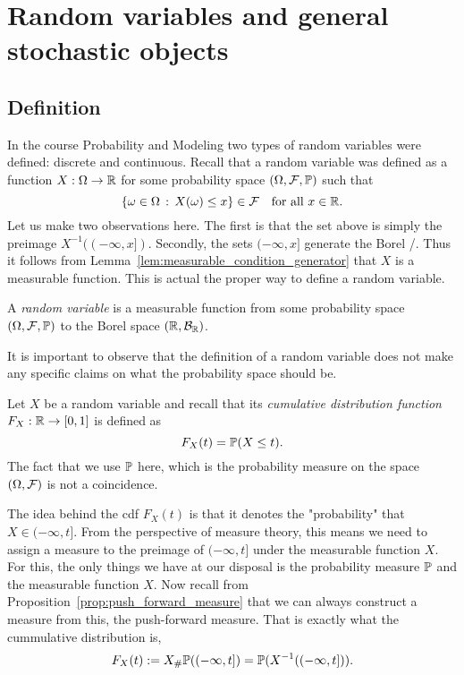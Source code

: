 
\section{Random variables and general stochastic objects}\label{sec:random_variables}


\subsection{Definition}

In the course Probability and Modeling two types of random variables were defined: discrete and continuous. Recall that a random variable was defined as a function $X : \Omega \to \mathbb R$ for some probability space $(\Omega, \mathcal F, \mathbb P)$ such that
\[
	\{\omega \in \Omega \, : \, X(\omega) \le x\} \in \mathcal F \quad \text{for all } x \in \mathbb R.
\]
Let us make two observations here. The first is that the set above is simply the preimage $X^{-1}((-\infty,x])$. Secondly, the sets $(-\infty, x]$ generate the Borel \sigalg/. Thus it follows from Lemma~\ref{lem:measurable_condition_generator} that $X$ is a measurable function. This is actual the proper way to define a random variable.

\begin{definition}
A \emph{random variable} is a measurable function from some probability space $(\Omega,\mathcal F, \mathbb P)$ to the Borel space $(\mathbb R, \mathcal B_{\mathbb R})$.
\end{definition}

It is important to observe that the definition of a random variable does not make any specific claims on what the probability space should be. 

Let $X$ be a random variable and recall that its \emph{cumulative distribution function} $F_X : \mathbb R \to [0,1]$ is defined as
\[
	F_X(t) = \mathbb P(X \le t).
\] 
The fact that we use $\mathbb P$ here, which is the probability measure on the space $(\Omega, \mathcal F)$ is not a coincidence.

The idea behind the cdf $F_X(t)$ is that it denotes the "probability" that $X \in (-\infty ,t]$. From the perspective of measure theory, this means we need to assign a measure to the preimage of $(-\infty, t]$ under the measurable function $X$. For this, the only things we have at our disposal is the probability measure $\mathbb P$ and the measurable function $X$. Now recall from Proposition~\ref{prop:push_forward_measure} that we can always construct a measure from this, the push-forward measure. That is exactly what the cummulative distribution is,
\[
	F_X(t) := X_\# \mathbb P((-\infty, t]) = \mathbb P(X^{-1}((-\infty,t])).
\]

